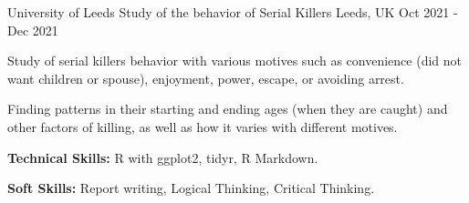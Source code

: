 

\begin{cventries}
  \cventry
    {University of Leeds} %
    {Study of the behavior of Serial Killers} %
    {Leeds, UK} %
    {Oct 2021 - Dec 2021} %
    {
      \begin{cvitems} %
        \item {Study of serial killers behavior with various motives such as convenience (did not want children or spouse), enjoyment, power, escape, or avoiding arrest.}
        \item {Finding patterns in their starting and ending ages (when they are caught) and other factors of killing, as well as how it varies with different motives.}
        \item {\textbf{Technical Skills:} R with ggplot2, tidyr, R Markdown.}
        \item {\textbf{Soft Skills:} Report writing, Logical Thinking, Critical Thinking.}
      \end{cvitems}
    }

\end{cventries}
